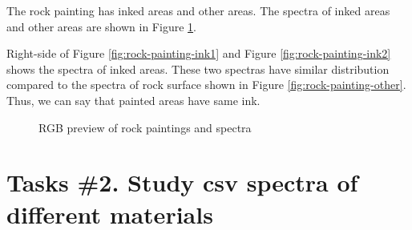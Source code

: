 The rock painting has inked areas and other areas. The spectra of inked areas and other areas are shown in Figure \ref{fig:rock-painting}.

Right-side of Figure \ref{fig:rock-painting-ink1} and Figure \ref{fig:rock-painting-ink2} shows the spectra of inked areas. These two spectras have similar distribution compared to the spectra of rock surface shown in Figure \ref{fig:rock-painting-other}. Thus, we can say that painted areas have same ink.

\begin{figure}[H]
  \centering
  \hspace{0.1cm}
  \vspace{0.1cm}
  \caption[]{RGB preview of rock paintings and spectra }
  \label{fig:rock-painting}
\end{figure}

\section{Tasks \#2. Study csv spectra of different materials}

